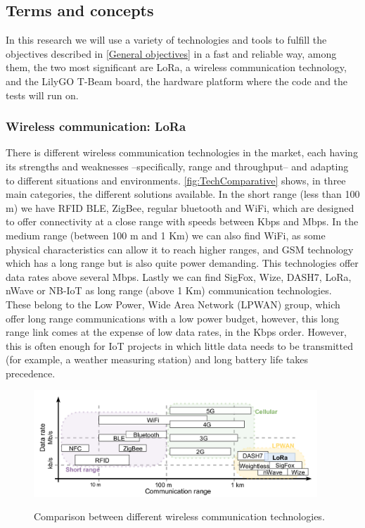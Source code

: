 \subsection{Terms and concepts}
In this research we will use a variety of technologies and tools to fulfill the objectives described in \autoref{General objectives} in a fast and reliable way, among them, the two most significant are LoRa, a wireless communication technology, and the LilyGO T-Beam board, the hardware platform where the code and the tests will run on.
\subsubsection{Wireless communication: LoRa}
There is different wireless communication technologies in the market, each having its strengths and weaknesses –specifically, range and throughput– and adapting to different situations and environments. \autoref{fig:TechComparative} shows, in three main categories, the different solutions available. In the short range (less than 100 m) we have RFID BLE, ZigBee, regular bluetooth and WiFi, which are designed to offer connectivity at a close range with speeds between Kbps and Mbps. In the medium range (between 100 m and 1 Km) we can also find WiFi, as some physical characteristics can allow it to reach higher ranges, and GSM technology which has a long range but is also quite power demanding. This technologies offer data rates above several Mbps. Lastly we can find SigFox, Wize, DASH7, LoRa, nWave or NB-IoT as long range (above 1 Km) communication technologies. These belong to the Low Power, Wide Area Network (LPWAN) group, which offer long range communications with a low power budget, however, this long range link comes at the expense of low data rates, in the Kbps order. However, this is often enough for IoT projects in which little data needs to be transmitted (for example, a weather measuring station) and long battery life takes precedence.
\begin{figure}[h]
        \centering
        \includegraphics[height=4cm]{Figures/TechComparative.png}
        \caption[Comparision between communication technologies]{Comparison between different wireless communication technologies.}
        \cite{StarOfStars}
        \label{fig:TechComparative}
\end{figure}


